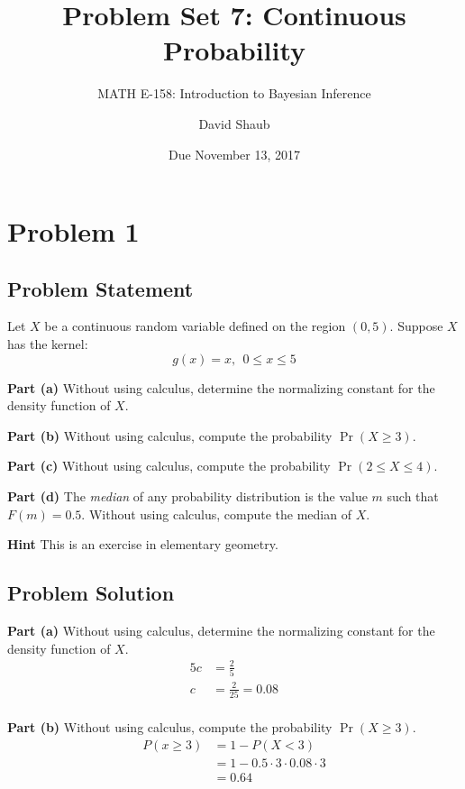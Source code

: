 \documentclass[12pt]{article}
\title{Problem Set 7: Continuous Probability}
\author{MATH E-158: Introduction to Bayesian Inference}
\author{David Shaub}
\date{Due November 13, 2017}
\theoremstyle{definition}
\begin{document}
	
	\maketitle


\section*{Problem 1}


\subsection*{Problem Statement}

Let $X$ be a continuous random variable defined on the region $(0,5)$. Suppose $X$ has the kernel:
$$
g(x) = x, \ \ 0 \leq x \leq 5
$$

\bigskip
\noindent
{\bf Part (a)} Without using calculus, determine the normalizing constant for the density function of $X$.

\bigskip
\noindent
{\bf Part (b)} Without using calculus, compute the probability $\Pr(X \geq 3)$.

\bigskip
\noindent
{\bf Part (c)} Without using calculus, compute the probability $\Pr(2 \leq X \leq 4)$.

\bigskip
\noindent
{\bf Part (d)} The {\em median} of any probability distribution is the value $m$ such that $F(m) = 0.5$. Without using calculus, compute the median of $X$.

\bigskip
\noindent
{\bf Hint} This is an exercise in elementary geometry.





\subsection*{Problem Solution}
\bigskip
\noindent
{\bf Part (a)} Without using calculus, determine the normalizing constant for the density function of $X$.\\
\begin{align*}
5c &= \frac{2}{5}\\
c &= \frac{2}{25} = 0.08\\
\end{align*}

\bigskip
\noindent
{\bf Part (b)} Without using calculus, compute the probability $\Pr(X \geq 3)$.
\begin{align*}
P(x \geq 3) &= 1 - P(X < 3)\\
&= 1 - 0.5 \cdot 3 \cdot 0.08 \cdot 3\\
&= 0.64
\end{align*}
\end{document}
